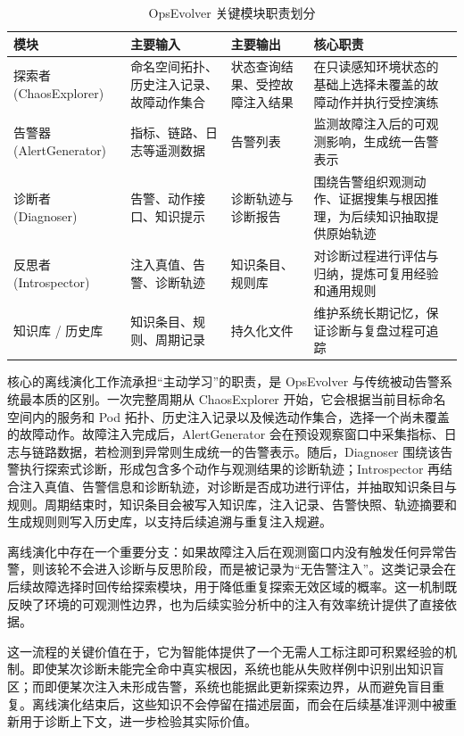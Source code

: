 \begin{table}[htbp]
    \centering
    \caption{OpsEvolver 关键模块职责划分}
    \label{tab:module-responsibility}
    \small
    \begin{tabular}{>{\centering\arraybackslash}m{2.6cm}>{\centering\arraybackslash}m{3.1cm}>{\centering\arraybackslash}m{3.1cm}>{\centering\arraybackslash}m{4.2cm}}
        \toprule
        模块 & 主要输入 & 主要输出 & 核心职责 \\
        \midrule
        探索者 (ChaosExplorer) & 命名空间拓扑、历史注入记录、故障动作集合 & 状态查询结果、受控故障注入结果 & 在只读感知环境状态的基础上选择未覆盖的故障动作并执行受控演练 \\
        告警器 (AlertGenerator) & 指标、链路、日志等遥测数据 & 告警列表 & 监测故障注入后的可观测影响，生成统一告警表示 \\
        诊断者 (Diagnoser) & 告警、动作接口、知识提示 & 诊断轨迹与诊断报告 & 围绕告警组织观测动作、证据搜集与根因推理，为后续知识抽取提供原始轨迹 \\
        反思者 (Introspector) & 注入真值、告警、诊断轨迹 & 知识条目、规则库 & 对诊断过程进行评估与归纳，提炼可复用经验和通用规则 \\
        知识库 / 历史库 & 知识条目、规则、周期记录 & 持久化文件 & 维护系统长期记忆，保证诊断与复盘过程可追踪 \\
        \bottomrule
    \end{tabular}
\end{table}

核心的离线演化工作流承担“主动学习”的职责，是 OpsEvolver 与传统被动告警系统最本质的区别。一次完整周期从 ChaosExplorer 开始，它会根据当前目标命名空间内的服务和 Pod 拓扑、历史注入记录以及候选动作集合，选择一个尚未覆盖的故障动作。故障注入完成后，AlertGenerator 会在预设观察窗口中采集指标、日志与链路数据，若检测到异常则生成统一的告警表示。随后，Diagnoser 围绕该告警执行探索式诊断，形成包含多个动作与观测结果的诊断轨迹；Introspector 再结合注入真值、告警信息和诊断轨迹，对诊断是否成功进行评估，并抽取知识条目与规则。周期结束时，知识条目会被写入知识库，注入记录、告警快照、轨迹摘要和生成规则则写入历史库，以支持后续追溯与重复注入规避。

离线演化中存在一个重要分支：如果故障注入后在观测窗口内没有触发任何异常告警，则该轮不会进入诊断与反思阶段，而是被记录为“无告警注入”。这类记录会在后续故障选择时回传给探索模块，用于降低重复探索无效区域的概率。这一机制既反映了环境的可观测性边界，也为后续实验分析中的注入有效率统计提供了直接依据。

这一流程的关键价值在于，它为智能体提供了一个无需人工标注即可积累经验的机制。即使某次诊断未能完全命中真实根因，系统也能从失败样例中识别出知识盲区；而即便某次注入未形成告警，系统也能据此更新探索边界，从而避免盲目重复。离线演化结束后，这些知识不会停留在描述层面，而会在后续基准评测中被重新用于诊断上下文，进一步检验其实际价值。

